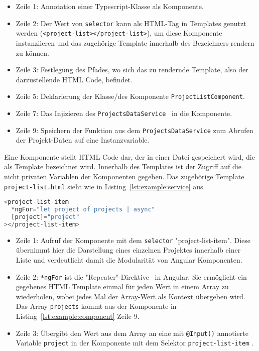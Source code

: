 \begin{itemize}
    \setlength\itemsep{-1em}
    \item Zeile 1: Annotation einer Typescript-Klasse als Komponente.
    \item Zeile 2: Der Wert von \texttt{selector} kann als HTML-Tag in Templates genutzt werden (\texttt{<project-list></project-list>}),
    um diese Komponente instanziieren und das zugehörige Template innerhalb des Bezeichners rendern zu können.
    \item Zeile 3: Festlegung des Pfades, wo sich das zu rendernde Template, also der darzustellende HTML Code, befindet.
    \item Zeile 5: Deklarierung der Klasse/des Komponente \texttt{ProjectListComponent}.
    \item Zeile 7: Das Injizieren des \texttt{ProjectsDataService}~\cite{angular-http} in die Komponente.
    \item Zeile 9: Speichern der Funktion aus dem \texttt{ProjectsDataService} zum Abrufen der Projekt-Daten auf eine Instanzvariable.
\end{itemize}

Eine Komponente stellt HTML Code dar, der in einer Datei gespeichert wird, die als Template bezeichnet wird.
Innerhalb des Templates ist der Zugriff auf die nicht privaten Variablen der Komponenten gegeben.
Das zugehörige Template \texttt{project-list.html} sieht wie in Listing~\ref{lst:example:service} aus.

\begin{lstlisting}[language=JavaScript,float=h!,caption={Funktion zum Abruf aller Projekte vom Server}, label={lst:example:service}]
<project-list-item
  *ngFor="let project of projects | async"
  [project]="project"
></project-list-item>
\end{lstlisting}

\begin{itemize}
    \setlength\itemsep{-1em}
    \item Zeile 1: Aufruf der Komponente mit dem \texttt{selector} "project-list-item".
    Diese übernimmt hier die Darstellung eines einzelnen Projektes innerhalb einer Liste und verdeutlicht damit
    die Modularität von Angular Komponenten.
    \item Zeile 2: \texttt{*ngFor} ist die "Repeater"-Direktive~\cite{ng-for} in Angular.
    Sie ermöglicht ein gegebenes HTML Template einmal für jeden Wert in einem Array zu wiederholen,
    wobei jedes Mal der Array-Wert als Kontext übergeben wird. Das Array \texttt{projects} kommt aus der Komponente in Listing~\ref{lst:example:component} Zeile 9.
    \item Zeile 3: Übergibt den Wert aus dem Array an eine mit \texttt{@Input()} annotierte Variable \texttt{project} in der Komponente mit dem Selektor \texttt{project-list-item} .
\end{itemize}

